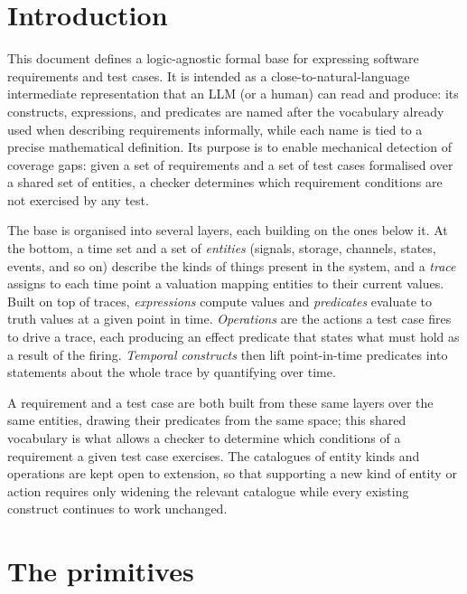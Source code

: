 
\section{Introduction}

This document defines a logic-agnostic formal base for expressing software requirements and test cases. It is intended as a close-to-natural-language intermediate representation that an LLM (or a human) can read and produce: its constructs, expressions, and predicates are named after the vocabulary already used when describing requirements informally, while each name is tied to a precise mathematical definition. Its purpose is to enable mechanical detection of coverage gaps: given a set of requirements and a set of test cases formalised over a shared set of entities, a checker determines which requirement conditions are not exercised by any test.

The base is organised into several layers, each building on the ones below it. At the bottom, a time set and a set of \emph{entities} (signals, storage, channels, states, events, and so on) describe the kinds of things present in the system, and a \emph{trace} assigns to each time point a valuation mapping entities to their current values. Built on top of traces, \emph{expressions} compute values and \emph{predicates} evaluate to truth values at a given point in time. \emph{Operations} are the actions a test case fires to drive a trace, each producing an effect predicate that states what must hold as a result of the firing. \emph{Temporal constructs} then lift point-in-time predicates into statements about the whole trace by quantifying over time.

A requirement and a test case are both built from these same layers over the same entities, drawing their predicates from the same space; this shared vocabulary is what allows a checker to determine which conditions of a requirement a given test case exercises. The catalogues of entity kinds and operations are kept open to extension, so that supporting a new kind of entity or action requires only widening the relevant catalogue while every existing construct continues to work unchanged.

\section{The primitives}

